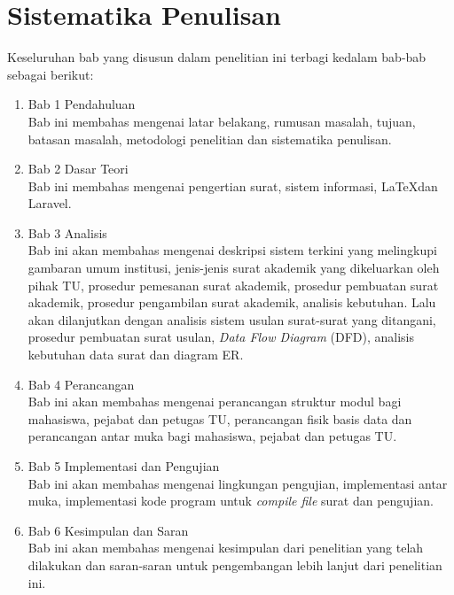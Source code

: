\section{Sistematika Penulisan}
\label{sec:sistematika_penulisan}
Keseluruhan bab yang disusun dalam penelitian ini terbagi kedalam bab-bab sebagai berikut:
\begin{enumerate}
	\item Bab 1 Pendahuluan \\
	Bab ini membahas mengenai latar belakang, rumusan masalah, tujuan, batasan masalah, metodologi penelitian dan sistematika penulisan.
	\item Bab 2 Dasar Teori \\
	Bab ini membahas mengenai pengertian surat, sistem informasi, \LaTeX dan Laravel.
	\item Bab 3 Analisis \\
	Bab ini akan membahas mengenai deskripsi sistem terkini yang melingkupi gambaran umum institusi, jenis-jenis surat akademik yang dikeluarkan oleh pihak TU, prosedur pemesanan surat akademik, prosedur pembuatan surat akademik, prosedur pengambilan surat akademik, analisis kebutuhan. Lalu akan dilanjutkan dengan analisis sistem usulan surat-surat yang ditangani, prosedur pembuatan surat usulan, \textit{Data Flow Diagram} (DFD), analisis kebutuhan data surat dan diagram ER.
	\item Bab 4 Perancangan \\
	Bab ini akan membahas mengenai perancangan struktur modul bagi mahasiswa, pejabat dan petugas TU, perancangan fisik basis data dan perancangan antar muka bagi mahasiswa, pejabat dan petugas TU.
	\item Bab 5 Implementasi dan Pengujian \\
	Bab ini akan membahas mengenai lingkungan pengujian, implementasi antar muka, implementasi kode program untuk \textit{compile file} surat dan pengujian.
	\item Bab 6 Kesimpulan dan Saran \\ 
	Bab ini akan membahas mengenai kesimpulan dari penelitian yang telah dilakukan dan saran-saran untuk pengembangan lebih lanjut dari penelitian ini.
\end{enumerate}